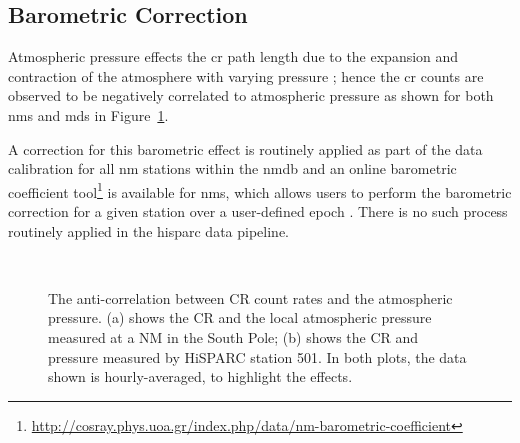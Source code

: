 

\subsection{Barometric Correction}\label{sec:HS_P_corr}


Atmospheric pressure effects the \gls{cr} path length due to the expansion and contraction of the atmosphere with varying pressure \citep{dorman_theory_1972, paschalis_online_2013}; hence the \gls{cr} counts are observed to be negatively correlated to atmospheric pressure as shown for both \glspl{nm} and \glspl{md} in Figure~\ref{fig:CR_V_P}. 

A correction for this barometric effect is routinely applied as part of the data calibration for all \gls{nm} stations within the \gls{nmdb} and an online barometric coefficient tool\footnote{\url{http://cosray.phys.uoa.gr/index.php/data/nm-barometric-coefficient}} is available for \glspl{nm}, which allows users to perform the barometric correction for a given station over a user-defined epoch \citep{paschalis_online_2013}. There is no such process routinely applied in the \gls{hisparc} data pipeline.


\begin{figure}[ht]
	\centering
	 \\
	
	\caption{The anti-correlation between CR count rates and the atmospheric pressure. (a) shows the CR and the local atmospheric pressure measured at a NM in the South Pole; (b) shows the CR and pressure measured by HiSPARC station 501. In both plots, the data shown is hourly-averaged, to highlight the effects.}
	\label{fig:CR_V_P}
\end{figure}


